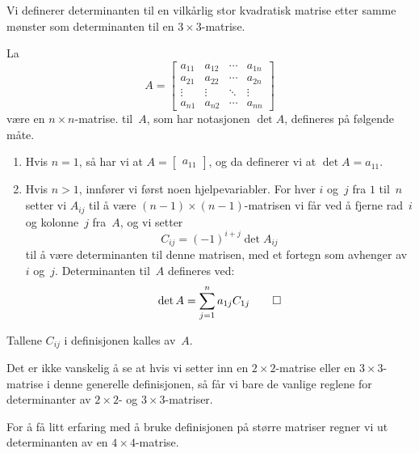 Vi definerer determinanten til en vilkårlig stor kvadratisk matrise
etter samme mønster som determinanten til en $3 \times 3$-matrise.

\begin{defn}
La
\[
A =
\begin{bmatrix}
a_{11} & a_{12} & \cdots & a_{1n} \\
a_{21} & a_{22} & \cdots & a_{2n} \\
\vdots & \vdots & \ddots & \vdots \\
a_{n1} & a_{n2} & \cdots & a_{nn}
\end{bmatrix}
\]
være en $n \times n$-matrise.   til~$A$, som
har notasjonen $\det A$, defineres på følgende måte.
\begin{enumerate}
\item Hvis $n = 1$, så har vi at
$A = \begin{bmatrix} a_{11} \end{bmatrix}$, og da definerer vi at
$\det A = a_{11}$.
\item Hvis $n > 1$, innfører vi først noen hjelpevariabler.  For hver
$i$ og~$j$ fra $1$ til~$n$ setter vi $A_{ij}$ til å være
$(n-1) \times (n-1)$-matrisen vi får ved å fjerne rad~$i$ og
kolonne~$j$ fra~$A$, og vi setter
\[
C_{ij} = (-1)^{i + j} \det A_{ij}
\]
til å være determinanten til denne matrisen, med et fortegn som
avhenger av $i$ og~$j$.  Determinanten til~$A$ defineres ved:
\[
\det A = \sum_{j=1}^n a_{1j} C_{1j}\qedhere
\]
\end{enumerate}
\end{defn}

Tallene $C_{ij}$ i definisjonen kalles  av~$A$.

Det er ikke vanskelig å se at hvis vi setter inn en
$2 \times 2$-matrise eller en $3 \times 3$-matrise i denne generelle
definisjonen, så får vi bare de vanlige reglene for determinanter av
$2 \times 2$- og $3 \times 3$-matriser.

For å få litt erfaring med å bruke definisjonen på større matriser
regner vi ut determinanten av en $4 \times 4$-matrise.

